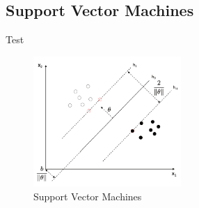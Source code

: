 \subsection{Support Vector Machines}
\label{svm}
Test
\begin{figure}[!h]    
    \centering
    \includegraphics[width=0.5\textwidth]{supervisedLearning/svm.png}
    \caption{Support Vector Machines}
    \label{fig:svm}
\end{figure}